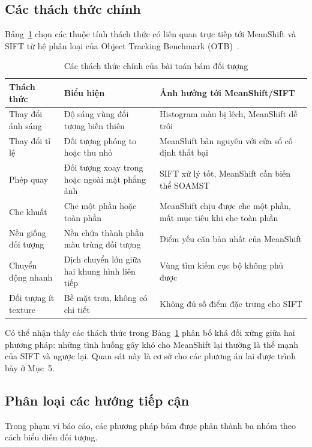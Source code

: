 \documentclass[12pt,a4paper]{article}
\numberwithin{equation}{section}
\begin{document}
\subsection{Các thách thức chính}

Bảng~\ref{tab:challenges} chọn các thuộc tính thách thức có liên quan trực tiếp tới MeanShift và SIFT từ hệ phân loại của Object Tracking Benchmark (OTB)~\cite{wu2015}.

\begin{table}[H]
\centering
\caption{Các thách thức chính của bài toán bám đối tượng}
\label{tab:challenges}
\small
\begin{tabular}{@{}p{4.0cm}p{5.3cm}p{5.2cm}@{}}
\toprule
\textbf{Thách thức} & \textbf{Biểu hiện} & \textbf{Ảnh hưởng tới MeanShift/SIFT} \\
\midrule
Thay đổi ánh sáng & Độ sáng vùng đối tượng biến thiên & Histogram màu bị lệch, MeanShift dễ trôi \\
Thay đổi tỉ lệ & Đối tượng phóng to hoặc thu nhỏ & MeanShift bản nguyên với cửa sổ cố định thất bại \\
Phép quay & Đối tượng xoay trong hoặc ngoài mặt phẳng ảnh & SIFT xử lý tốt, MeanShift cần biến thể SOAMST \\
Che khuất & Che một phần hoặc toàn phần & MeanShift chịu được che một phần, mất mục tiêu khi che toàn phần \\
Nền giống đối tượng & Nền chứa thành phần màu trùng đối tượng & Điểm yếu căn bản nhất của MeanShift \\
Chuyển động nhanh & Dịch chuyển lớn giữa hai khung hình liên tiếp & Vùng tìm kiếm cục bộ không phủ được \\
Đối tượng ít texture & Bề mặt trơn, không có chi tiết & Không đủ số điểm đặc trưng cho SIFT \\
\bottomrule
\end{tabular}
\end{table}

Có thể nhận thấy các thách thức trong Bảng~\ref{tab:challenges} phân bố khá đối xứng giữa hai
phương pháp: những tình huống gây khó cho MeanShift lại thường là thế mạnh của SIFT và ngược lại.
Quan sát này là cơ sở cho các phương án lai được trình bày ở Mục~5.

\subsection{Phân loại các hướng tiếp cận}

Trong phạm vi báo cáo, các phương pháp bám được phân thành ba nhóm theo cách biểu diễn đối tượng.
\end{document}
